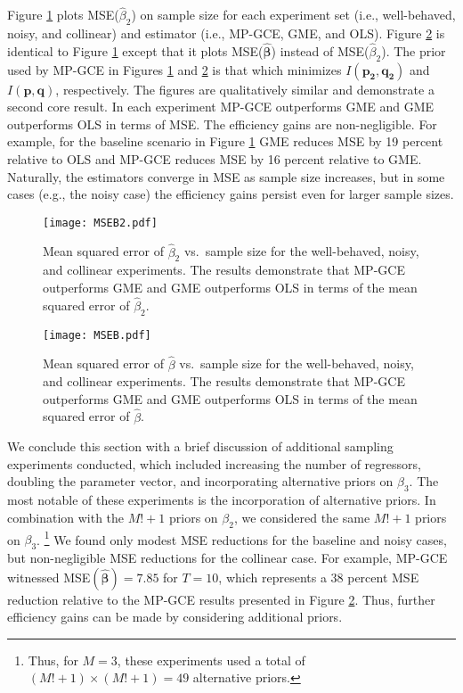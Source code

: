 \documentclass{elsarticle}
\begin{document}
Figure \ref{fig: MSEB1} plots MSE($\hat{\beta}_2$) on sample size for each 
experiment set (i.e., well-behaved, noisy, and collinear) and estimator (i.e., MP-GCE, 
GME, and OLS).
Figure \ref{fig: MSEB} is identical to Figure \ref{fig: MSEB1} except that it plots 
MSE($\mathbf{\hat{\beta}}$) instead of MSE($\hat{\beta}_2$).
The prior used by MP-GCE in Figures \ref{fig: MSEB1} and \ref{fig: MSEB} is that which 
minimizes $I(\mathbf{p_2}, \mathbf{q_2})$ and $I(\mathbf{p}, \mathbf{q})$, respectively.
The figures are qualitatively similar and demonstrate a second core result.
In each experiment MP-GCE outperforms GME and GME outperforms OLS in terms of MSE.
The efficiency gains are non-negligible.
For example, for the baseline scenario in Figure \ref{fig: MSEB1} GME reduces MSE by 
19 percent relative to OLS and MP-GCE reduces MSE by 16 percent relative to GME.
Naturally, the estimators converge in MSE as sample size increases, but in some cases
(e.g., the noisy case) the efficiency gains persist even for larger sample sizes.

\begin{figure}[!h]
\centering
\texttt{[image: MSEB2.pdf]}
\caption{Mean squared error of $\hat{\beta}_2$ vs.\ sample size for the well-behaved,
noisy, and collinear experiments. The results demonstrate that MP-GCE outperforms 
GME and GME outperforms OLS in terms of the mean squared error of $\hat{\beta}_2$.}
\label{fig: MSEB1}
\end{figure}

\begin{figure}[!h]
\centering
\texttt{[image: MSEB.pdf]}
\caption{Mean squared error of $\hat{\beta}$ vs.\ sample size for the well-behaved,
noisy, and collinear experiments. The results demonstrate that MP-GCE outperforms 
GME and GME outperforms OLS in terms of the mean squared error of $\hat{\beta}$.}
\label{fig: MSEB}
\end{figure}

We conclude this section with a brief discussion of additional sampling 
experiments conducted, which included increasing the number of regressors,
doubling the parameter vector, and incorporating alternative priors on $\beta_3$.
The most notable of these experiments is the incorporation of alternative priors.
In combination with the $M! + 1$ priors on $\beta_2$, we considered the 
same $M! + 1$ priors on $\beta_3$.%
\footnote{Thus, for $M=3$, these experiments used a total of $(M! + 1)\times (M! + 1) 
= 49$ alternative priors.}
We found only modest MSE reductions for the baseline and noisy cases, but
non-negligible MSE reductions for the collinear case.
For example, MP-GCE witnessed MSE$(\mathbf{\hat{\beta}})=7.85$ for $T=10$,
which represents a 38 percent MSE reduction relative to the MP-GCE results presented
in Figure \ref{fig: MSEB}.
Thus, further efficiency gains can be made by considering additional priors.
\end{document}
